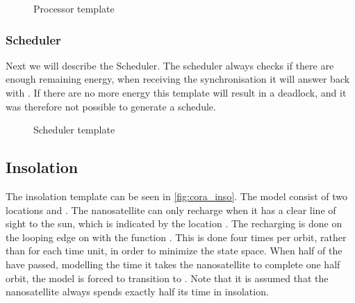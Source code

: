 \begin{figure}[h]
	\caption{Processor template}
	\label{fig:cora_pro}
\end{figure}



\subsubsection*{Scheduler}\label{ssec:cora_sch}
Next we will describe the Scheduler. The scheduler always checks if there are enough remaining energy, when receiving the synchronisation  it will answer back with . If there are no more energy this template will result in a deadlock, and it was therefore not possible to generate a schedule.

\begin{figure}[H]
	\centering
	\caption{Scheduler template}
	\label{fig:cora_schedule}
\end{figure}


\subsection*{Insolation} \label{ssec:cora_ins}
The insolation template can be seen in \cref{fig:cora_inso}. The model consist of two locations  and . The nanosatellite can only recharge when it has a clear line of sight to the sun, which is indicated by the location . The recharging is done on the looping edge on  with the function . This is done four times per orbit, rather than for each time unit, in order to minimize the state space. When half of the  have passed, modelling the time it takes the nanosatellite to complete one half orbit, the model is forced to transition to . Note that it is assumed that the nanosatellite always spends exactly half its time in insolation.

